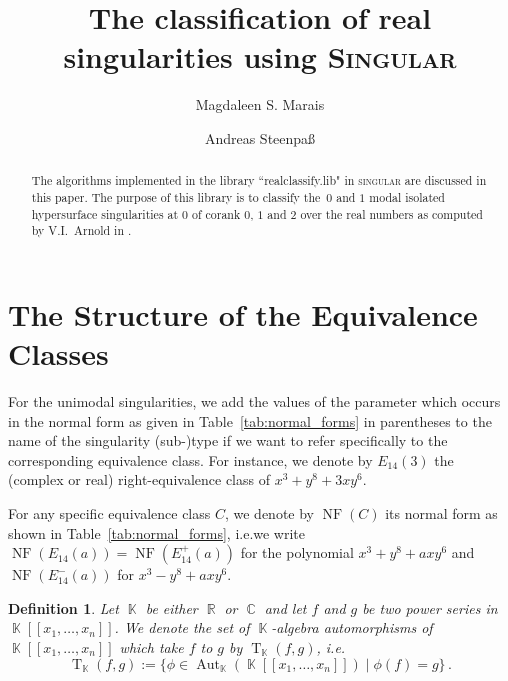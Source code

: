 \documentclass[noend]{amsproc}
\title{The classification of real singularities using \textsc{Singular}}
\author{Magdaleen S. Marais}
\author{Andreas Steenpa\ss}
\newtheorem{defn}[theorem]{Definition}
\theoremstyle{definition}
\newcommand{\NF}[1]{\operatorname{NF}(#1)}
\DeclareMathOperator{\R}{\mathbb{R}}
\DeclareMathOperator{\C}{\mathbb{C}}
\DeclareMathOperator{\K}{\mathbb{K}}
\DeclareMathOperator{\T}{T}
\DeclareMathOperator{\Aut}{Aut}
\begin{document}
\begin{abstract}
The algorithms implemented in the library ``realclassify.lib" in
\textsc{singular} are discussed in this paper. The purpose of this library is
to classify the~$0$ and $1$ modal isolated hypersurface singularities at $0$ of
corank $0$, $1$ and $2$ over the real numbers as computed by V.I.~Arnold in
\cite{AVG1985}.
\end{abstract}
\maketitle

\section{The Structure of the Equivalence Classes}

For the unimodal singularities, we add the values of the parameter which occurs
in the normal form as given in Table~\ref{tab:normal_forms} in parentheses to
the name of the singularity (sub-)type if we want to refer specifically to the
corresponding equivalence class. For instance, we denote by $E_{14}(3)$ the
(complex or real) right-equivalence class of $x^3+y^8+3xy^6$.

For any specific equivalence class $C$, we denote by $\NF{C}$ its normal form
as shown in Table~\ref{tab:normal_forms}, i.e.\@ we write
$\NF{E_{14}(a)} = \NF{E_{14}^+(a)}$ for the polynomial $x^3+y^8+axy^6$ and
$\NF{E_{14}^-(a)}$ for $x^3-y^8+axy^6$.

\begin{defn}
Let $\K$ be either $\R$ or $\C$ and let $f$ and $g$ be two power series in
$\K[[x_1, \ldots, x_n]]$. We denote the set of $\K$-algebra automorphisms
of $\K[[x_1, \ldots, x_n]]$ which take $f$ to $g$ by $\T_{\K}(f,g)$, i.e.\@
\[
\T_{\K}(f,g)
:= \{\phi \in \Aut_{\K}(\K[[x_1, \ldots, x_n]]) \mid \phi(f) = g \} \,.
\]
\end{defn}
\end{document}
